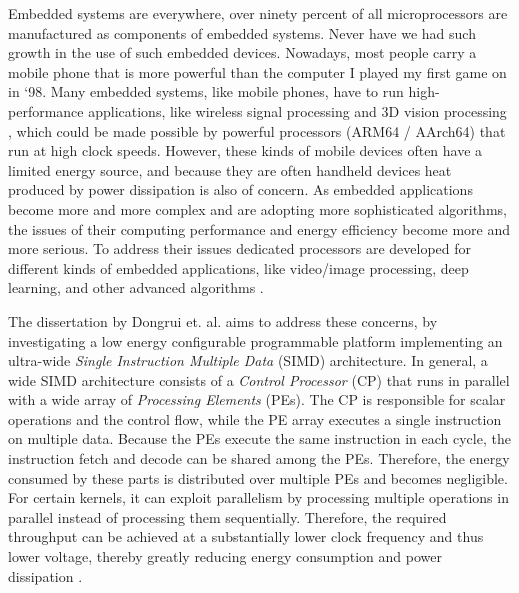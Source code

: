 



Embedded systems are everywhere, over ninety percent of all microprocessors are manufactured as components of embedded systems.
Never have we had such growth in the use of such embedded devices. Nowadays, most people carry a mobile phone that is more powerful than the computer I played my first game on in `98. %
Many embedded systems, like mobile phones, have to run high-performance applications, like wireless signal processing and 3D vision processing \cite{dongrio1}, which could be made possible by powerful processors (ARM64 / AArch64) that run at high clock speeds. However, these kinds of mobile devices often have a limited energy source, and because they are often handheld devices heat produced by power dissipation is also of concern. As embedded applications become more and more complex and are adopting more sophisticated algorithms, the issues of their computing performance and energy efficiency become more and more serious. To address their issues dedicated processors are developed for different kinds of embedded applications, like video/image processing, deep learning, and other advanced algorithms \cite{lechjozwiak}.

The dissertation by Dongrui et. al. \cite{dongrui} aims to address these concerns, by investigating a low energy configurable programmable platform implementing an ultra-wide \emph{Single Instruction Multiple Data} (SIMD) architecture. In general, a wide SIMD architecture consists of a \emph{Control Processor} (CP) that runs in parallel with a wide array of \emph{Processing Elements} (PEs). The CP is responsible for scalar operations and the control flow, while the PE array executes a single instruction on multiple data. Because the PEs execute the same instruction in each cycle, the instruction fetch and decode can be shared among the PEs. Therefore, the energy consumed by these parts is distributed over multiple PEs and becomes negligible. For certain kernels, it can exploit parallelism by processing multiple operations in parallel instead of processing them sequentially. Therefore, the required throughput can be achieved at a substantially lower clock frequency and thus lower voltage, thereby greatly reducing energy consumption and power dissipation \cite{dongrio2}.%

